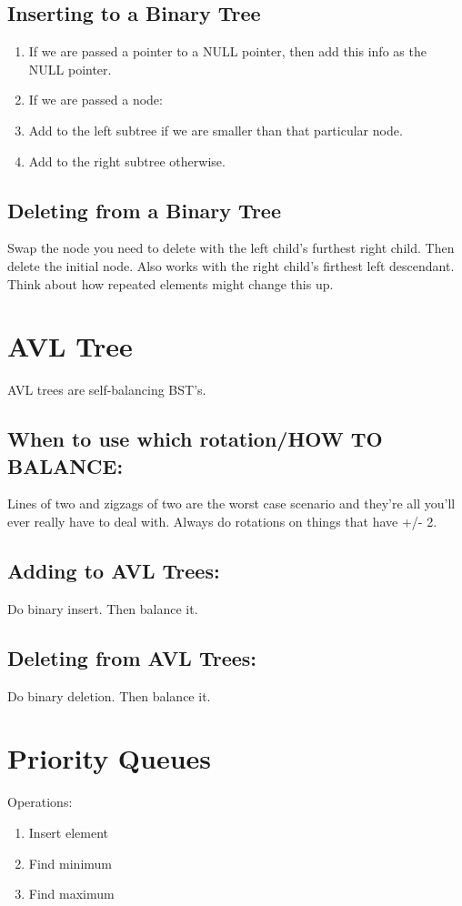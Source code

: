 \documentclass[a4paper,12pt]{report}
\begin{document}
\subsection{Inserting to a Binary Tree}
\begin{enumerate}
\item If we are passed a pointer to a NULL pointer, then add this info as the NULL pointer.
\item If we are passed a node:
\item Add to the left subtree if we are smaller than that particular node.
\item Add to the right subtree otherwise.
\end{enumerate}


\subsection{Deleting from a Binary Tree}
Swap the node you need to delete with the left child's furthest right child. Then delete the initial node. Also works with the right child's firthest left descendant. Think about how repeated elements might change this up. 

\section{AVL Tree}
AVL trees are self-balancing BST's.
\subsection{When to use which rotation/HOW TO BALANCE: }
Lines of two and zigzags of two are the worst case scenario and they're all you'll ever really have to deal with.
Always do rotations on things that have +/- 2. 

\subsection{Adding to AVL Trees: }
Do binary insert. Then balance it. 

\subsection{Deleting from AVL Trees: }
Do binary deletion. Then balance it.

\section{Priority Queues}
Operations:
\begin{enumerate}
\item Insert element
\item Find minimum
\item Find maximum
\end{enumerate}
\end{document}
